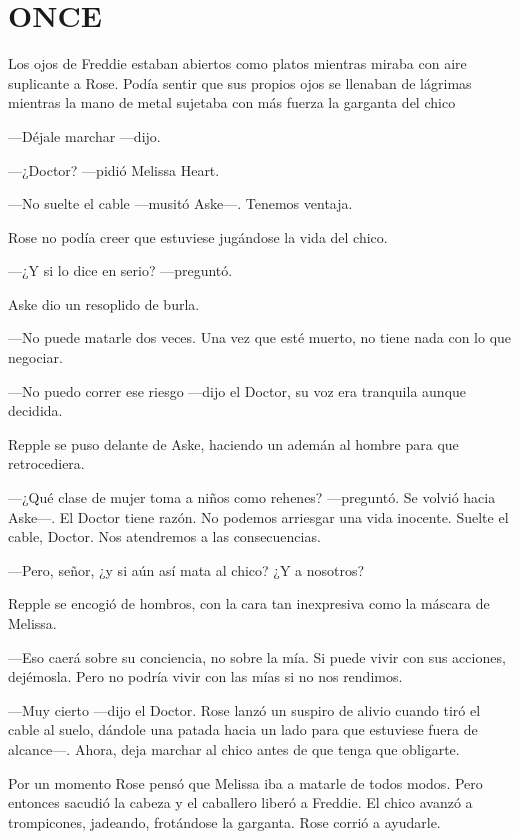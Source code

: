 \chapter*{ONCE}

{Los ojos de Freddie estaban abiertos como platos mientras miraba con
	aire suplicante a Rose. Podía sentir que sus propios ojos se llenaban de
	lágrimas mientras la mano de metal sujetaba con más fuerza la garganta
del chico}

{---Déjale marchar ---dijo.}

{---¿Doctor? ---pidió Melissa Heart.}

{---No suelte el cable ---musitó Aske---. Tenemos ventaja.}

{Rose no podía creer que estuviese jugándose la vida del chico.}

{---¿Y si lo dice en serio? ---preguntó.}

{Aske dio un resoplido de burla.}

{---No puede matarle dos veces. Una vez que esté muerto, no tiene nada
con lo que negociar.}

{---No puedo correr ese riesgo ---dijo el Doctor, su voz era tranquila
aunque decidida.}

{Repple se puso delante de Aske, haciendo un ademán al hombre para que
retrocediera.}

{---¿Qué clase de mujer toma a niños como rehenes? ---preguntó. Se
	volvió hacia Aske---. El Doctor tiene razón. No podemos arriesgar una
	vida inocente. Suelte el cable, Doctor. Nos atendremos a las
consecuencias.}

{---Pero, señor, ¿y si aún así mata al chico? ¿Y a nosotros?}

{Repple se encogió de hombros, con la cara tan inexpresiva como la
máscara de Melissa.}

{---Eso caerá sobre su conciencia, no sobre la mía. Si puede vivir con
	sus acciones, dejémosla. Pero no podría vivir con las mías si no nos
rendimos.}

{---Muy cierto ---dijo el Doctor. Rose lanzó un suspiro de alivio cuando
	tiró el cable al suelo, dándole una patada hacia un lado para que
	estuviese fuera de alcance---. Ahora, deja marchar al chico antes de que
tenga que obligarte.}

{Por un momento Rose pensó que Melissa iba a matarle de todos modos.
	Pero entonces sacudió la cabeza y el caballero liberó a Freddie. El
	chico avanzó a trompicones, jadeando, frotándose la garganta. Rose
corrió a ayudarle.}

